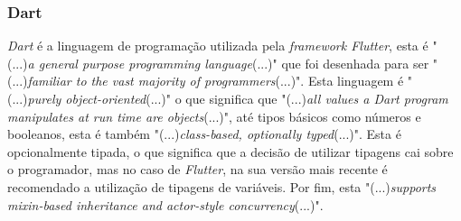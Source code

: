 \subsubsection{Dart}
\textit{Dart} é a linguagem de programação utilizada pela \textit{framework Flutter}, esta é "(...)\emph{a general purpose programming language}(...)"\citep{dart_pg_lang} que foi desenhada para ser "(...)\emph{familiar to the vast majority of programmers}(...)"\citep{dart_pg_lang}. Esta linguagem é "(...)\emph{purely object-oriented}(...)" o que significa que "(...)\emph{all values a Dart program manipulates at run time are objects}(...)"\citep{dart_pg_lang}, até tipos básicos como números e booleanos, esta é também "(...)\emph{class-based, optionally typed}(...)"\citep{dart_pg_lang}. Esta é opcionalmente tipada, o que significa que a decisão de utilizar tipagens cai sobre o programador, mas no caso de \textit{Flutter}, na sua versão mais recente é recomendado a utilização de tipagens de variáveis. Por fim, esta "(...)\emph{supports mixin-based inheritance and actor-style concurrency}(...)"\citep{dart_pg_lang}.